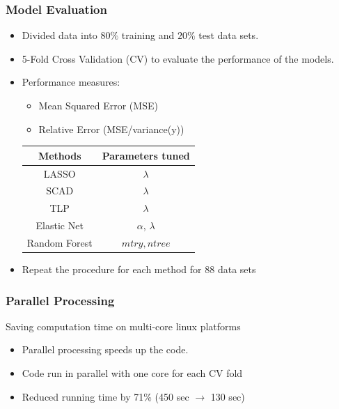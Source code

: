 \documentclass[table]{beamer}
\begin{document}
\begin{frame}
\frametitle{Model Evaluation}
\begin{itemize}
  \item Divided data into $80\%$ training and $20\%$ test data sets.
  \item 5-Fold Cross Validation (CV) to evaluate the performance of the models.
  \item Performance measures: 
  \begin{itemize}
    \item Mean Squared Error (MSE)
    \item Relative Error (MSE/variance(y))
  \end{itemize} 
\begin{table}
\centering
\begin{tabular}{|c | c|}
\hline
Methods & Parameters tuned\\
\hline
LASSO  & $\lambda$\\
SCAD & $\lambda$\\
TLP & $\lambda$\\
Elastic Net & $\alpha$, $\lambda$\\
Random Forest & $mtry, ntree$\\
\hline
\end{tabular}
\end{table}
\medskip
\item Repeat the procedure for each method for 88 data sets
\end{itemize}
\end{frame}

\begin{frame}[fragile]
  \frametitle{Parallel Processing}
  Saving computation time on multi-core linux platforms
  \begin{itemize}
    \item Parallel processing speeds up the code.
    \medskip
    \item Code run in parallel with one core for each CV fold
    \medskip
  \item Reduced running time by 71\% (450 sec $\rightarrow$ 130 sec)
    \medskip
  \end{itemize}
  \begin{center}
    
  \end{center}
\end{frame}
\end{document}
